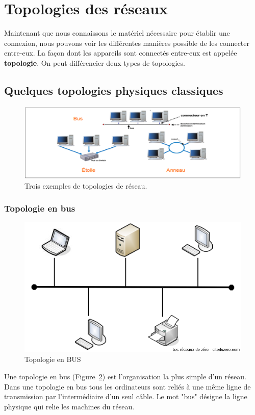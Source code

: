 \section{Topologies des réseaux}
Maintenant que nous connaissons le matériel nécessaire pour établir une connexion, nous pouvons voir les différentes manières possible de les connecter entre-eux. La façon dont les appareils sont connectés entre-eux est appelée \textbf{topologie}. On peut différencier deux types de topologies.


\subsection{Quelques topologies physiques classiques}
\begin{figure}[h!t]
  \centering
  \includegraphics[width=.7\textwidth]{images/topologies/reseau_topologies}
  \caption{Trois exemples de topologies de réseau.}
  \label{fig:res_topo}
\end{figure}
\subsubsection{Topologie en bus}
\begin{figure}[h!]
  \centering
  \includegraphics[width=.4\textwidth]{images/topologies/topologieBus}
  \caption{Topologie en BUS}
  \label{fig:topoBus}
\end{figure}
Une topologie en bus (Figure~\ref{fig:topoBus}) est l'organisation la plus simple d'un réseau. Dans une topologie en bus tous les ordinateurs sont reliés à une même ligne de transmission par l'intermédiaire d'un seul câble. Le mot "bus" désigne la ligne physique qui relie les machines du réseau.

